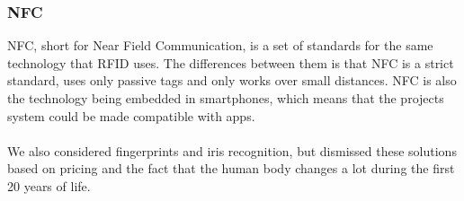 \subsubsection{NFC}
NFC, short for Near Field Communication, is a set of standards for the same technology that RFID uses. The differences between them is that NFC is a strict standard, uses only passive tags and only works over small distances.\citep{rfidAndNfc} NFC is also the technology being embedded in smartphones, which means that the projects system could be made compatible with apps.\\
\\
We also considered fingerprints and iris recognition, but dismissed these solutions based on pricing and the fact that the human body changes a lot during the first 20 years of life.\citep{irisid}


